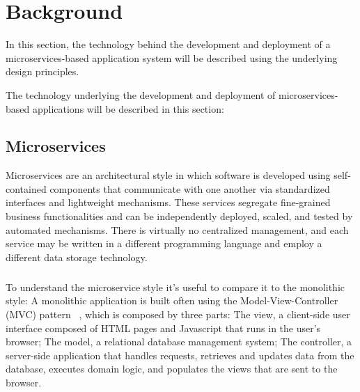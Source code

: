 
%

\chapter{Background}
\label{cha:background}

In this section, the technology behind the development and deployment of a microservices-based
application system will be described using the underlying design principles.

The technology underlying the development and deployment of microservices-based applications will be described in this section:

\section{Microservices} %
\label{sec:microservices}

Microservices \cite{microservices, microservices2017tenets, microservicesTomorrow} are an architectural style in which software is developed using self-contained components that
communicate with one another via standardized interfaces and lightweight mechanisms.
These services segregate fine-grained business functionalities and can be independently deployed, scaled, and tested by automated mechanisms.
There is virtually no centralized management, and each service may be written in a different programming language and employ a different data storage technology.

\paragraph{}

To understand the microservice style it's useful to compare it to the monolithic style:
A monolithic application is built often using the Model-View-Controller (MVC) pattern ~\cite{mvc}, which is composed by three parts:
The view, a client-side user interface composed of HTML pages and Javascript that runs in the user's browser;
The model, a relational database management system;
The controller, a server-side application that handles requests, retrieves and updates data from the database, executes domain logic,
and populates the views that are sent to the browser.

